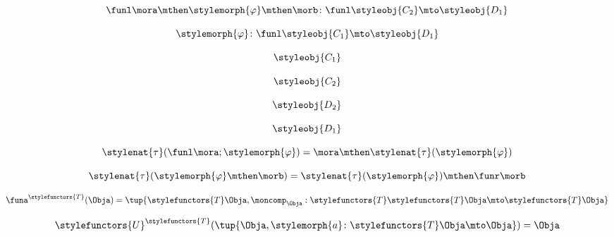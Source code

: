 \begin{forslides}
    \begin{equation}
        \label{eq:slides_adjunctions_72}
       \funl \mora \mthen \stylemorph{\varphi} \mthen \morb \colon \funl \styleobj{C_2} \mto \styleobj{D_1}
    \end{equation}
    
    \begin{equation}
        \label{eq:slides_adjunctions_73}
       \stylemorph{\varphi} \colon \funl \styleobj{C_1} \mto \styleobj{D_1}
    \end{equation}
    
     \begin{equation}
        \label{eq:slides_adjunctions_74}
       \styleobj{C_1}
    \end{equation}
    
    \begin{equation}
        \label{eq:slides_adjunctions_75}
       \styleobj{C_2}
    \end{equation}
    
    \begin{equation}
        \label{eq:slides_adjunctions_76}
       \styleobj{D_2}
    \end{equation}
    
    \begin{equation}
        \label{eq:slides_adjunctions_77}
       \styleobj{D_1}
    \end{equation}
    
    \begin{equation}
        \label{eq:slides_adjunctions_78}
       \stylenat{\tau} (\funl \mora; \stylemorph{\varphi}) = \mora \mthen \stylenat{\tau}(\stylemorph{\varphi})
    \end{equation}
    
     \begin{equation}
        \label{eq:slides_adjunctions_79}
       \stylenat{\tau} (\stylemorph{\varphi} \mthen \morb) =  \stylenat{\tau}(\stylemorph{\varphi}) \mthen \funr \morb
    \end{equation}
    
    \begin{equation}
        \label{eq:slides_adjunctions_80}
      \funa^{\stylefunctors{T}}(\Obja) = \tup{ \stylefunctors{T} \Obja, \moncomp_{\Obja} : \stylefunctors{T} \stylefunctors{T} \Obja \mto \stylefunctors{T} \Obja}
    \end{equation}
    
    \begin{equation}
        \label{eq:slides_adjunctions_81}
     \stylefunctors{U}^{\stylefunctors{T}}( \tup{\Obja, \stylemorph{a} \colon \stylefunctors{T} \Obja \mto \Obja}) = \Obja
    \end{equation}
    

\end{forslides}
